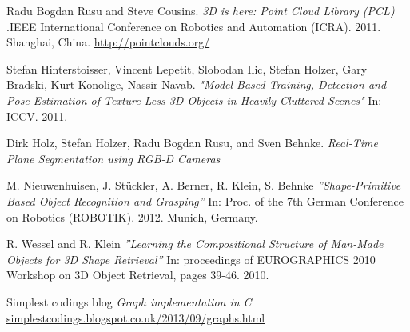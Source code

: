 \documentclass[fontsize=12pt]{article}
\begin{document}
\begin{thebibliography}{9}
   Radu Bogdan Rusu and Steve Cousins. \emph{3D is here: Point Cloud Library (PCL)}
  .IEEE International Conference on Robotics and Automation (ICRA). 2011. Shanghai, China.
  \url{http://pointclouds.org/}   
  
   Stefan Hinterstoisser, Vincent Lepetit, Slobodan Ilic, Stefan Holzer, Gary
Bradski, Kurt Konolige, Nassir Navab.
   \emph{"Model Based Training, Detection and Pose
Estimation of Texture-Less 3D Objects in
Heavily Cluttered Scenes"} In: ICCV. 2011. 
   
   Dirk Holz, Stefan Holzer, Radu Bogdan Rusu, and Sven Behnke. 
    \emph{Real-Time Plane Segmentation using RGB-D Cameras} 

    M. Nieuwenhuisen, J. Stückler, A. Berner, R. Klein, S. Behnke
   \emph{''Shape-Primitive Based Object Recognition and Grasping''}
   In: Proc. of the 7th German Conference on Robotics (ROBOTIK). 2012. Munich, Germany.

   R. Wessel and R. Klein
  \emph{''Learning the Compositional Structure of Man-Made Objects for 3D Shape Retrieval''}
  In: proceedings of EUROGRAPHICS 2010 Workshop on 3D Object Retrieval, pages 39-46. 2010.

  Simplest codings blog
  \emph{Graph implementation in C}
  \url{simplestcodings.blogspot.co.uk/2013/09/graphs.html}
\end{thebibliography}
\end{document}
